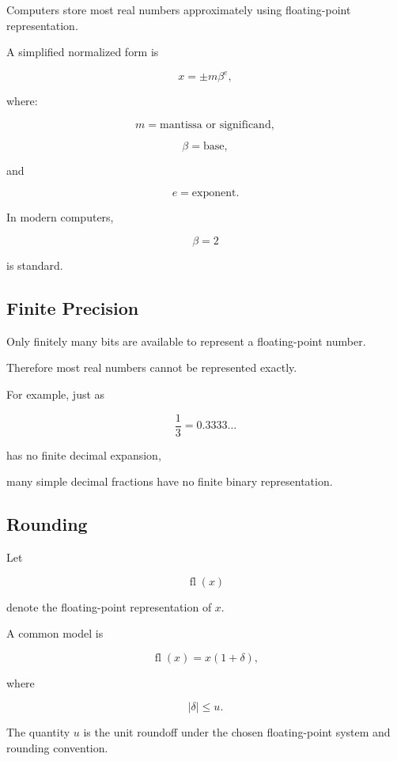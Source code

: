 Computers store most real numbers approximately using floating-point
representation.

A simplified normalized form is

\[
\boxed{
x
=
\pm
m
\beta^e,
}
\]

where:

\[
m
=
\text{mantissa or significand},
\]

\[
\beta
=
\text{base},
\]

and

\[
e
=
\text{exponent}.
\]

In modern computers,

\[
\boxed{
\beta=2
}
\]

is standard.

\subsection{Finite Precision}
\label{subsec:finite-precision}

Only finitely many bits are available to represent a floating-point
number.

Therefore most real numbers cannot be represented exactly.

For example, just as

\[
\frac13
=
0.3333\ldots
\]

has no finite decimal expansion,

many simple decimal fractions have no finite binary representation.

\subsection{Rounding}
\label{subsec:floating-point-rounding}

Let

\[
\operatorname{fl}(x)
\]

denote the floating-point representation of \(x\).

A common model is

\[
\boxed{
\operatorname{fl}(x)
=
x(1+\delta),
}
\]

where

\[
\boxed{
|\delta|
\leq
u.
}
\]

The quantity \(u\) is the unit roundoff under the chosen floating-point
system and rounding convention.

